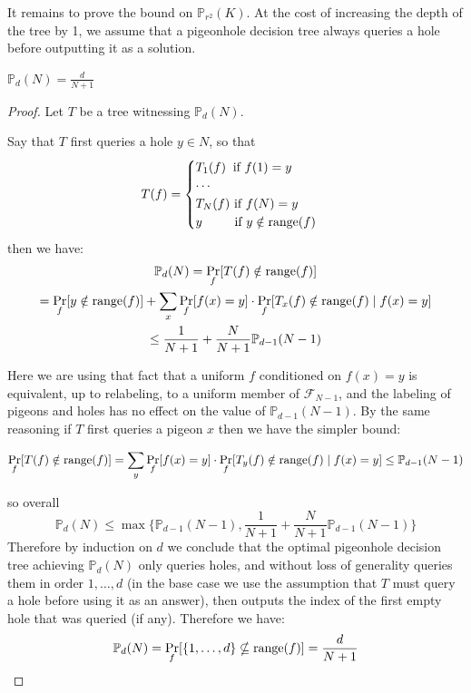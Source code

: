 It remains to prove the bound on $\mathbb{P}_{r^2}(K)$. At the cost of increasing the depth of the tree by 1, we assume that a pigeonhole decision tree always queries a hole before outputting it as a solution.

\begin{lemma}\label{lem:pdt-lb}
$\mathbb{P}_d(N) = \frac{d}{N+1}$
\end{lemma}
\begin{proof}
Let $T$ be a tree witnessing $\mathbb{P}_d(N)$. 

Say that $T$ first queries a hole $y \in N$, so that 
\[
T(f) = \begin{cases}
T_1(f) \text{\;\;if } f(1) = y\\
\cdots \\
T_{N}(f) \text{ if } f(N) = y\\
y \text{\;\;\;\;\;\;\;\; if } y \notin \mathrm{range}(f)
\end{cases}
\]
then we have:
\begin{gather*}
\mathbb{P}_d(N) = \Pr_{f}[T(f) \notin \mathrm{range}(f)] \\
= \Pr_f[y \notin \mathrm{range}(f)] + \sum\limits_{x}\Pr_f[f(x)=y] \cdot \Pr_f[T_x(f) \notin \mathrm{range}(f) \mid f(x)=y] \\
\leq \frac{1}{N+1} + \frac{N}{N+1} \mathbb{P}_{d-1}(N-1)
\end{gather*}

Here we are using that fact that a uniform $f$ conditioned on $f(x)=y$ is equivalent, up to relabeling, to a uniform member of $\mathcal{F}_{N-1}$, and the labeling of pigeons and holes has no effect on the value of $\mathbb{P}_{d-1}(N-1)$. By the same reasoning if $T$ first queries a pigeon $x$ then we have the simpler bound:

\begin{gather*}
\Pr_{f}[T(f) \notin \mathrm{range}(f)] = \sum\limits_{y} \Pr_f[f(x)=y] \cdot \Pr_f[T_y(f) \notin \mathrm{range}(f) \mid f(x)=y]
\leq  \mathbb{P}_{d-1}(N-1)
\end{gather*}

so overall
\[
\mathbb{P}_d(N) \leq \max\{\mathbb{P}_{d-1}(N-1),\frac{1}{N+1} + \frac{N}{N+1} \mathbb{P}_{d-1}(N-1)\}
\]
Therefore by induction on $d$ we conclude that the optimal pigeonhole decision tree achieving $\mathbb{P}_d(N)$ only queries holes, and without loss of generality queries them in order $1,\ldots, d$ (in the base case we use the assumption that $T$ must query a hole before using it as an answer), then outputs the index of the first empty hole that was queried (if any). Therefore we have:
\[
\mathbb{P}_d(N) = \Pr_f[\{1,\ldots,d\} \nsubseteq \mathrm{range}(f)] = \frac{d}{N+1}
\]
\end{proof}

